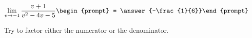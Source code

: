 \documentclass{ximera}
\author{Bart Snapp}
\begin{document}
\begin{exercise}

\[
\lim_{v\to -1 } \frac{v+1}{v^2-4 v-5}\begin{prompt} = \answer{-\frac{1}{6}}\end{prompt}
\]
\begin{hint}
Try to factor either the numerator or the denominator.
\end{hint}
\end{exercise}
\end{document}
